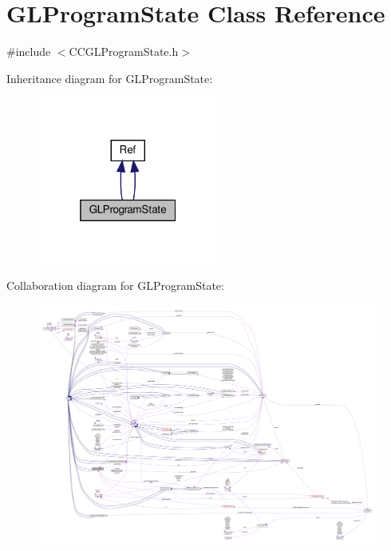 \hypertarget{classGLProgramState}{}\section{G\+L\+Program\+State Class Reference}
\label{classGLProgramState}


{\ttfamily \#include $<$C\+C\+G\+L\+Program\+State.\+h$>$}



Inheritance diagram for G\+L\+Program\+State\+:
\nopagebreak
\begin{figure}[H]
\begin{center}
\leavevmode
\includegraphics[width=169pt]{classGLProgramState__inherit__graph}
\end{center}
\end{figure}


Collaboration diagram for G\+L\+Program\+State\+:
\nopagebreak
\begin{figure}[H]
\begin{center}
\leavevmode
\includegraphics[width=350pt]{classGLProgramState__coll__graph}
\end{center}
\end{figure}
